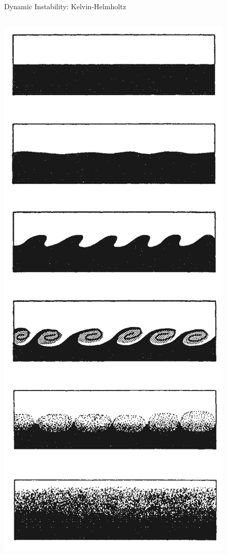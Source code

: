 \begin{frame}{Dynamic Instability: Kelvin-Helmholtz}
\begin{columns}[T]
    \begin{column}{.3\textwidth}
    	\begin{minipage}[c][0.75\textheight][c]{\linewidth}
    		\includegraphics[width=\textwidth]{kh}

\end{minipage}
\end{column}
\end{columns}
\end{frame}
